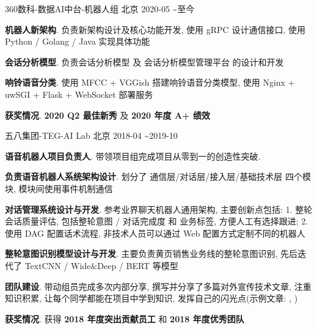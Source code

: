 


\begin{cventries}
	
	
	{360数科-数据AI中台-机器人组} %
	{北京} %
	{2020-05 \textasciitilde 至今}
	{ %
		\begin{cvitems}
			\item \textbf{机器人新架构}. 负责新架构设计及核心功能开发, 使用 gRPC 设计通信接口, 使用 Python / Golang / Java 实现具体功能
			\item \textbf{会话分析模型}. 负责会话分析模型 及 会话分析模型管理平台 的设计和开发
			\item \textbf{响铃语音分类}. 使用 MFCC + VGGish 搭建响铃语音分类模型, 使用 Nginx + uwSGI + Flask + WebSocket 部署服务
			\item \textbf{获奖情况}. \textbf{2020 Q2 最佳新秀} 及 \textbf{2020 年度 A+ 绩效}
		\end{cvitems}
	}
	
	
	{五八集团-TEG-AI Lab} %
	{北京} %
	{2018-04 \textasciitilde 2019-10} %
	{ %
		\begin{cvitems}
			\item{\textbf{语音机器人项目负责人}. 带领项目组完成项目从零到一的创造性突破. }
			\item{\textbf{负责语音机器人系统架构设计}. 划分了 通信层/对话层/接入层/基础技术层 四个模块, 模块间使用事件机制通信}
			\item{\textbf{对话管理系统设计与开发}. 参考业界聊天机器人通用架构, 主要创新点包括: 1. 整轮会话质量评估, 包括整轮意图 / 对话完成度 和 业务标签, 方便人工有选择跟进;  2. 使用 DAG 配置话术流程, 非技术人员可以通过 Web 配置方式定制不同的机器人}
			\item{\textbf{整轮意图识别模型设计与开发}. 主要负责黄页销售业务线的整轮意图识别, 先后迭代了 TextCNN / Wide\&Deep / BERT 等模型}
			\item{\textbf{团队建设}. 带动组员完成多次内部分享, 撰写并分享了多篇对外宣传技术文章, 注重知识积累, 让每个同学都能在项目中学到知识, 发挥自己的闪光点(示例文章: , ) }
			\item{\textbf{获奖情况}. 获得 \textbf{2018 年度突出贡献员工} 和 \textbf{2018 年度优秀团队}}
		\end{cvitems}
	}
	

\end{cventries}
